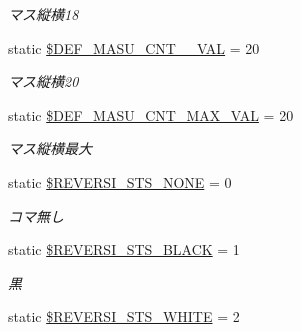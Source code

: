 \begin{DoxyCompactItemize}
\begin{DoxyCompactList}\small\item\em マス縦横18 \end{DoxyCompactList}\item 
static \hyperlink{class_reversi_const_ac987dbaa8da3871c3c35743aa26be89a}{\$\+D\+E\+F\+\_\+\+M\+A\+S\+U\+\_\+\+C\+N\+T\+\_\+\_\+\+V\+AL} = 20\hypertarget{class_reversi_const_ac987dbaa8da3871c3c35743aa26be89a}{}\label{class_reversi_const_ac987dbaa8da3871c3c35743aa26be89a}

\begin{DoxyCompactList}\small\item\em マス縦横20 \end{DoxyCompactList}\item 
static \hyperlink{class_reversi_const_ac57be288e8fbde4a2e620609ce02925b}{\$\+D\+E\+F\+\_\+\+M\+A\+S\+U\+\_\+\+C\+N\+T\+\_\+\+M\+A\+X\+\_\+\+V\+AL} = 20\hypertarget{class_reversi_const_ac57be288e8fbde4a2e620609ce02925b}{}\label{class_reversi_const_ac57be288e8fbde4a2e620609ce02925b}

\begin{DoxyCompactList}\small\item\em マス縦横最大 \end{DoxyCompactList}\item 
static \hyperlink{class_reversi_const_aafea7fe2f84562cd883a884285ded09c}{\$\+R\+E\+V\+E\+R\+S\+I\+\_\+\+S\+T\+S\+\_\+\+N\+O\+NE} = 0\hypertarget{class_reversi_const_aafea7fe2f84562cd883a884285ded09c}{}\label{class_reversi_const_aafea7fe2f84562cd883a884285ded09c}

\begin{DoxyCompactList}\small\item\em コマ無し \end{DoxyCompactList}\item 
static \hyperlink{class_reversi_const_a02fbb6f48064d833739f11e6c166d342}{\$\+R\+E\+V\+E\+R\+S\+I\+\_\+\+S\+T\+S\+\_\+\+B\+L\+A\+CK} = 1\hypertarget{class_reversi_const_a02fbb6f48064d833739f11e6c166d342}{}\label{class_reversi_const_a02fbb6f48064d833739f11e6c166d342}

\begin{DoxyCompactList}\small\item\em 黒 \end{DoxyCompactList}\item 
static \hyperlink{class_reversi_const_a7d7cce1f800aec960277bcfafe5eb9c2}{\$\+R\+E\+V\+E\+R\+S\+I\+\_\+\+S\+T\+S\+\_\+\+W\+H\+I\+TE} = 2\hypertarget{class_reversi_const_a7d7cce1f800aec960277bcfafe5eb9c2}{}\label{class_reversi_const_a7d7cce1f800aec960277bcfafe5eb9c2}


\end{DoxyCompactItemize}
